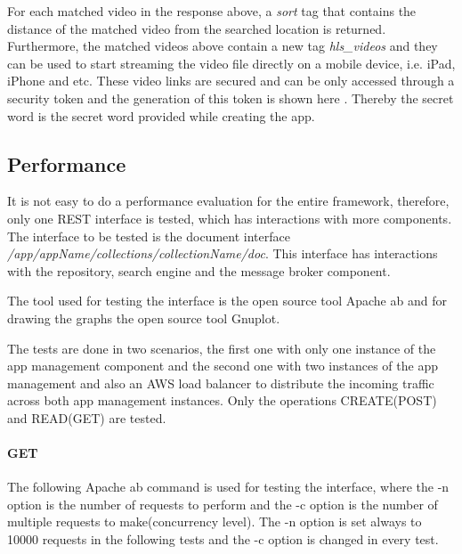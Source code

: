 For each matched video in the response above, a \textit{sort} tag that contains the distance of the matched video from the searched location is returned. Furthermore, the matched videos above contain a new tag \textit{hls\_videos} and they can be used to start streaming the video file directly on a mobile device, i.e. iPad, iPhone and etc. These video links are secured and can be only accessed through a security token and the generation of this token is shown here \cite{nginx:securelink}. Thereby the secret word is the secret word provided while creating the app.

\subsection{Performance\label{seq:eval_perf}}
It is not easy to do a performance evaluation for the entire framework, therefore, only one REST interface is tested, which has interactions with more components. The interface to be tested is the document interface \textit{/app/appName/collections/collectionName/doc}. This interface has interactions with the repository, search engine and the message broker component.%

The tool used for testing the interface is the open source tool Apache ab and for drawing the graphs the open source tool Gnuplot. 

The tests are done in two scenarios, the first one with only one instance of the app management component and the second one  with two instances of the app management and also an \ac{AWS} load balancer to distribute the incoming traffic across both app management instances. Only the operations CREATE(POST) and READ(GET) are tested.

\paragraph{GET}
The following Apache ab command is used for testing the interface, where the -n option is the number of requests to perform and the -c option is the number of multiple requests to make(concurrency level). The -n option is set always to 10000 requests in the following tests and the -c option is changed in every test.

